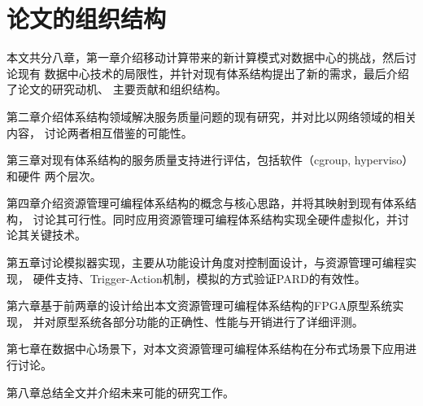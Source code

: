 \section{论文的组织结构}

本文共分八章，第一章介绍移动计算带来的新计算模式对数据中心的挑战，然后讨论现有
数据中心技术的局限性，并针对现有体系结构提出了新的需求，最后介绍了论文的研究动机、
主要贡献和组织结构。

第二章介绍体系结构领域解决服务质量问题的现有研究，并对比以网络领域的相关内容，
讨论两者相互借鉴的可能性。

第三章对现有体系结构的服务质量支持进行评估，包括软件（cgroup, hyperviso）和硬件
两个层次。

第四章介绍资源管理可编程体系结构的概念与核心思路，并将其映射到现有体系结构，
讨论其可行性。同时应用资源管理可编程体系结构实现全硬件虚拟化，并讨论其关键技术。

第五章讨论模拟器实现，主要从功能设计角度对控制面设计，与资源管理可编程实现，
硬件支持、Trigger-Action机制，模拟的方式验证PARD的有效性。

第六章基于前两章的设计给出本文资源管理可编程体系结构的FPGA原型系统实现，
并对原型系统各部分功能的正确性、性能与开销进行了详细评测。

第七章在数据中心场景下，对本文资源管理可编程体系结构在分布式场景下应用进行讨论。

第八章总结全文并介绍未来可能的研究工作。

